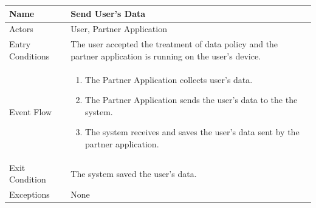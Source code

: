 \begin{enumerate}
\FloatBarrier
\begin{table}[h]
\begin{tabular}{|l|p{}|}
\hline
Name             & Send User's Data\\ \hline
Actors           & User, Partner Application  \\ \hline
Entry Conditions & The user accepted the treatment of data policy and the partner application is running on the user's device.  \\ \hline
Event Flow       & \begin{enumerate}
			\item The Partner Application collects user's data.
            \item The Partner Application sends the user's data to the the system.
            \item The system receives and saves the user's data sent by the partner application.
        \end{enumerate}\\ \hline
Exit Condition   & The system saved the user's data.\\ \hline
Exceptions       & None \\ \hline
\end{tabular}
\end{table}
\FloatBarrier


\end{enumerate}
